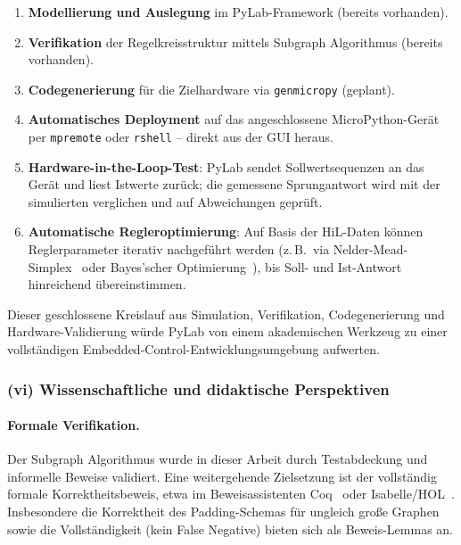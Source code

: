 \documentclass[a4paper,12pt]{article}
\theoremstyle{definition}
\begin{document}
\begin{enumerate}
    \item \textbf{Modellierung und Auslegung} im PyLab-Framework (bereits vorhanden).
    \item \textbf{Verifikation} der Regelkreisstruktur mittels Subgraph Algorithmus
          (bereits vorhanden).
    \item \textbf{Codegenerierung} für die Zielhardware via \texttt{genmicropy}
          (geplant).
    \item \textbf{Automatisches Deployment} auf das angeschlossene MicroPython-Gerät
          per \texttt{mpremote} oder \texttt{rshell} -- direkt aus der GUI heraus.
    \item \textbf{Hardware-in-the-Loop-Test}: PyLab sendet Sollwertsequenzen an das
          Gerät und liest Istwerte zurück; die gemessene Sprungantwort wird mit der
          simulierten verglichen und auf Abweichungen geprüft.
    \item \textbf{Automatische Regleroptimierung}: Auf Basis der HiL-Daten können
          Regler\-parameter iterativ nachgeführt werden (z.\,B.\ via
          Nelder-Mead-Sim\-plex~\cite{neldermead} oder Bayes'scher Opti\-mierung~\cite{mockus}), bis Soll- und
          Ist-Ant\-wort hinreichend über\-einstimmen.
\end{enumerate}

Dieser geschlossene Kreislauf aus Simulation, Verifikation, Codegenerierung und
Hard\-ware-Validierung würde PyLab von einem akademischen Werkzeug zu einer
vollständigen Embedded-Control-Entwicklungsumgebung aufwerten.

\subsubsection*{(vi) Wissenschaftliche und didaktische Perspektiven}

\paragraph{Formale Verifikation.}
Der Subgraph Algorithmus wurde in dieser Arbeit durch Testabdeckung und
informelle Beweise validiert. Eine weitergehende Zielsetzung ist der vollständig
formale Korrektheitsbeweis, etwa im Beweisassistenten Coq~\cite{coq} oder Isabelle/HOL~\cite{isabelle}.
Insbesondere die Korrektheit des Padding-Schemas für ungleich große Graphen
sowie die Vollständigkeit (kein False Negative) bieten sich als
Beweis-Lemmas an.
\end{document}
